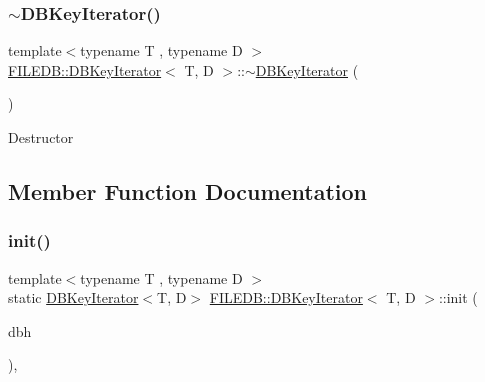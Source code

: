 \subsubsection{\texorpdfstring{$\sim$DBKeyIterator()}{~DBKeyIterator()}\hspace{0.1cm}{\footnotesize\ttfamily [2/2]}}
{\footnotesize\ttfamily template$<$typename T , typename D $>$ \\
\mbox{\hyperlink{classFILEDB_1_1DBKeyIterator}{F\+I\+L\+E\+D\+B\+::\+D\+B\+Key\+Iterator}}$<$ T, D $>$\+::$\sim$\mbox{\hyperlink{classFILEDB_1_1DBKeyIterator}{D\+B\+Key\+Iterator}} (\begin{DoxyParamCaption}\item[{void}]{ }\end{DoxyParamCaption})\hspace{0.3cm}{\ttfamily [inline]}}

Destructor 

\subsection{Member Function Documentation}
\mbox{\label{classFILEDB_1_1DBKeyIterator_af4a5e1eaeb6e5c491c5894f3e70f893c}} 
\subsubsection{\texorpdfstring{init()}{init()}\hspace{0.1cm}{\footnotesize\ttfamily [1/2]}}
{\footnotesize\ttfamily template$<$typename T , typename D $>$ \\
static \mbox{\hyperlink{classFILEDB_1_1DBKeyIterator}{D\+B\+Key\+Iterator}}$<$T, D$>$ \mbox{\hyperlink{classFILEDB_1_1DBKeyIterator}{F\+I\+L\+E\+D\+B\+::\+D\+B\+Key\+Iterator}}$<$ T, D $>$\+::init (\begin{DoxyParamCaption}\item[{\mbox{\hyperlink{other__libs_2filedb_2filehash_2ffdb__db_8h_a0b27b956926453a7a8141ea8e10f0df8}{F\+F\+D\+B\+\_\+\+DB}} $\ast$}]{dbh }\end{DoxyParamCaption})\hspace{0.3cm}{\ttfamily [inline]}, {\ttfamily [static]}}

